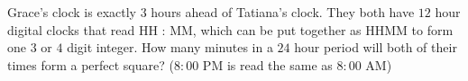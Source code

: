 Grace's clock is exactly $3$ hours ahead of Tatiana's clock. They both have $12$ hour digital clocks that read HH : MM, which can be put together as HHMM to form one $3$ or $4$ digit integer. How many minutes in a $24$ hour period will both of their times form a perfect square? ($8 : 00$ PM is read the same as $8 : 00$ AM)
